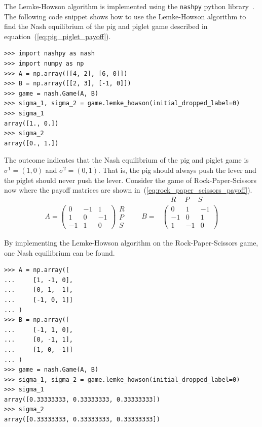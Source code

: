 The Lemke-Howson algorithm is implemented using the
\lstinline[style=pystyle]{nashpy} python library~\cite{thenashpyproject}.
The following code snippet shows how to use the Lemke-Howson algorithm to find
the Nash equilibrium of the pig and piglet game described in
equation~(\ref{eq:pig_piglet_payoff}).

\begin{lstlisting}[style=pystyle]
>>> import nashpy as nash
>>> import numpy as np
>>> A = np.array([[4, 2], [6, 0]])
>>> B = np.array([[2, 3], [-1, 0]])
>>> game = nash.Game(A, B)
>>> sigma_1, sigma_2 = game.lemke_howson(initial_dropped_label=0)
>>> sigma_1
array([1., 0.])
>>> sigma_2
array([0., 1.])

\end{lstlisting}

The outcome indicates that the Nash equilibrium of the pig and piglet game is
\(\sigma^1 = (1,0)\) and \(\sigma^2 = (0,1)\).
That is, the pig should always push the lever and the piglet should never push
the lever.
Consider the game of Rock-Paper-Scissors now where the payoff matrices are
shown in~(\ref{eq:rock_paper_scissors_payoff}).
\begin{align}
    & \quad \ R \quad \ P \quad \ S \nonumber \\
    A =
    \begin{pmatrix}
        0 & -1 & 1 \\
        1 & 0 & -1 \\
        -1 & 1 & 0
    \end{pmatrix}
    \begin{matrix}
        R \\
        P \\
        S
    \end{matrix} \qquad
    B = &
    \begin{pmatrix}
        0 & 1 & -1 \\
        -1 & 0 & 1 \\
        1 & -1 & 0
    \end{pmatrix}
    \label{eq:rock_paper_scissors_payoff}
\end{align}

By implementing the Lemke-Howson algorithm on the Rock-Paper-Scissors game, one
Nash equilibrium can be found.

\begin{lstlisting}[style=pystyle]
>>> A = np.array([
...     [1, -1, 0],
...     [0, 1, -1],
...     [-1, 0, 1]]
... )
>>> B = np.array([
...     [-1, 1, 0], 
...     [0, -1, 1],
...     [1, 0, -1]]
... )
>>> game = nash.Game(A, B)
>>> sigma_1, sigma_2 = game.lemke_howson(initial_dropped_label=0)
>>> sigma_1
array([0.33333333, 0.33333333, 0.33333333])
>>> sigma_2
array([0.33333333, 0.33333333, 0.33333333])

\end{lstlisting}

